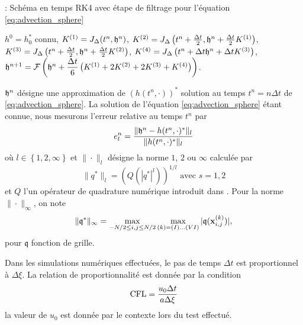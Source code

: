 \begin{center}
\begin{minipage}[H]{12cm}
  \begin{algorithm}[H]
    \caption{: Schéma en temps RK4 avec étape de filtrage pour l'équation \eqref{eq:advection_sphere} }\label{alg:RK4_transportSa}
    \begin{algorithmic}[1]
    \State $h^0 = h_0^*$ connu,
             \State  $K^{(1)} = J_{\Delta}(t^n, \mathfrak{h}^n)$,
             \State  $K^{(2)} = J_{\Delta}\left(t^n + \frac{\Delta t}{2}, \mathfrak{h}^n + \frac{\Delta t}{2} K^{(1)} \right)$,
             \State  $K^{(3)} = J_{\Delta}\left(t^n + \frac{\Delta t}{2}, \mathfrak{h}^n + \frac{\Delta t}{2} K^{(2)} \right)$,
             \State  $K^{(4)} = J_{\Delta}\left(t^n + \Delta t \mathfrak{h}^n + \Delta t K^{(3)} \right)$,  
             \State  $\mathfrak{h}^{n+1} = \mathcal{F}\left( \mathfrak{h}^n  + \dfrac{\Delta t}{6} \left( K^{(1)} + 2 K^{(2)} + 2 K^{(3)} + K^{(4)} \right) \right)$.
            \EndFor
    \end{algorithmic}
    \end{algorithm}
\end{minipage}
\end{center}

$\mathfrak{h}^n$ désigne une approximation de $(h(t^n,\cdot))^*$ solution au temps $t^n = n \Delta t$ de \eqref{eq:advection_sphere}.
La solution de l'équation \eqref{eq:advection_sphere} étant connue, nous mesurons l'erreur relative au temps $t^n$ par
\begin{equation}
e_l^n = \dfrac{\| \mathfrak{h}^n - h(t^n,\cdot)^* \|_l}{\| h(t^n,\cdot)^* \|_l}
\end{equation}
où $l \in \left\lbrace 1, 2, \infty \right\rbrace$ et $\| \cdot \|_l$ désigne la norme $1$, $2$ ou $\infty$ calculée par
\begin{equation}
\| q^* \|_l = \left( Q(|q^*|^l ) \right)^{1/l} \text{ avec } s=1,2
\end{equation}
et $Q$ l'un opérateur de quadrature numérique introduit dans \cite{Portelenelle2018}. Pour la norme $\| \cdot \|_{\infty}$, on note
\begin{equation}
\|  \mathfrak{q}^* \|_{\infty} = \max_{-N/2 \leq i,j \leq N/2} \max_{(k) = (I) ... (VI)} |\mathfrak{q}(\mathbf{x}_{i,j}^{(k)})|,
\end{equation}
pour $\mathfrak{q}$ fonction de grille.

Dans les simulations numériques effectuées, le pas de temps $\Delta t$ est proportionnel à $\Delta \xi$. La relation de proportionnalité est donnée par la condition
\begin{equation}
\text{CFL} = \dfrac{u_0 \Delta t}{a \Delta \xi}
\end{equation}
la valeur de $u_0$ est donnée par le contexte lors du test effectué.
















